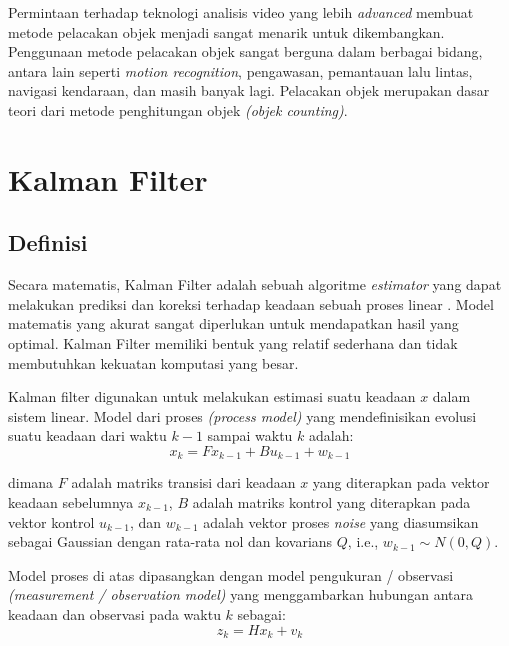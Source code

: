     Permintaan terhadap teknologi analisis video yang lebih \textit{advanced} membuat metode pelacakan objek menjadi sangat menarik untuk dikembangkan. Penggunaan metode pelacakan objek sangat berguna dalam berbagai bidang, antara lain seperti \textit{motion recognition}, pengawasan, pemantauan lalu lintas, navigasi kendaraan, dan masih banyak lagi. Pelacakan objek merupakan dasar teori dari metode penghitungan objek \textit{(objek counting)}.
  
\section{Kalman Filter}

    \subsection{Definisi}
        Secara matematis, Kalman Filter adalah sebuah algoritme \textit{estimator} yang dapat melakukan prediksi dan koreksi terhadap keadaan sebuah proses linear \citep{Chavan2017}. Model matematis yang akurat sangat diperlukan untuk mendapatkan hasil yang optimal. Kalman Filter memiliki bentuk yang relatif sederhana dan tidak membutuhkan kekuatan komputasi yang besar.
        
        Kalman filter digunakan untuk melakukan estimasi suatu keadaan $x$ dalam sistem linear. Model dari proses \textit{(process model)} yang mendefinisikan evolusi suatu keadaan dari waktu $k - 1$ sampai waktu $k$ adalah:
        \begin{equation}\label{eq:2.17}
        x_k = Fx_{k-1} + Bu_{k-1} + w_{k-1} 
        \end{equation}
        
        dimana $F$ adalah matriks transisi dari keadaan $x$ yang diterapkan pada vektor keadaan sebelumnya $x_{k-1}$, $B$ adalah matriks kontrol yang diterapkan pada vektor kontrol $u_{k-1}$, dan $w_{k-1}$ adalah vektor proses \textit{noise} yang diasumsikan sebagai Gaussian dengan rata-rata nol dan kovarians $Q$, i.e., $w_{k-1} \sim N(0, Q)$.
        
        Model proses di atas dipasangkan dengan model pengukuran / observasi \textit{(measurement / observation model)} yang menggambarkan hubungan antara keadaan dan observasi pada waktu $k$ sebagai:
        \begin{equation}\label{eq:2.18}
        z_k = Hx_{k} + v_{k} 
        \end{equation}
        
